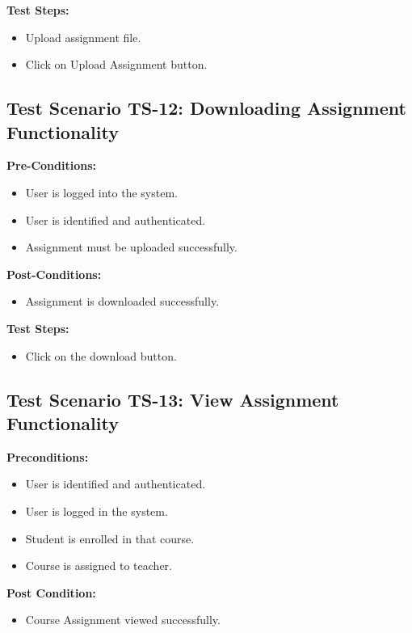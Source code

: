 \textbf{Test Steps:}
\begin{itemize}

\item Upload assignment file.
\item Click on Upload Assignment button.

\end{itemize}


\subsection{Test Scenario TS-12: Downloading Assignment Functionality}
\textbf{Pre-Conditions: }
\begin{itemize}

\item User is logged into the system.
\item User is identified and authenticated.
\item Assignment must be uploaded successfully.

\end{itemize}
\textbf{Post-Conditions: }
\begin{itemize}
\item Assignment is downloaded successfully.
\end{itemize}

\textbf{Test Steps:}
\begin{itemize}

\item Click on the download button.

\end{itemize}

\subsection{Test Scenario TS-13: View Assignment Functionality}
\textbf{Preconditions:}
\begin{itemize}
\item User is identified and authenticated.
\item User is logged in the system.
\item Student is enrolled in that course.
\item Course is assigned to teacher.
\end{itemize}
\textbf{Post Condition: }
\begin{itemize}
\item Course Assignment viewed successfully.
\end{itemize}



